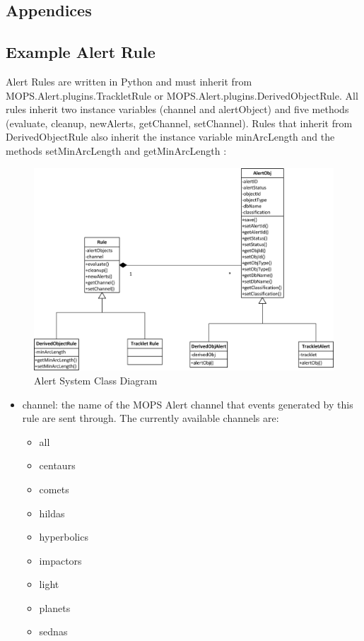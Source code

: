 \documentclass[panstarrs]{panstarrs}
\begin{document}
\begin{appendices}
\section{Appendices}
\subsection{Example Alert Rule}
Alert Rules are written in Python and must inherit from MOPS.Alert.plugins.TrackletRule or MOPS.Alert.plugins.DerivedObjectRule. All rules inherit two instance variables (channel and alertObject) and five methods (evaluate, cleanup, newAlerts, getChannel, setChannel). Rules that inherit from DerivedObjectRule also inherit the instance variable minArcLength and the methods setMinArcLength and getMinArcLength :

\begin{figure}
\begin{center}
\includegraphics[width=7in]{Alerts.jpg}
\caption{ Alert System Class Diagram}
\label{fig:class}
\end{center}
\end{figure}

\begin{itemize}
\item channel: the name of the MOPS Alert channel that events generated by this rule are sent through. The currently available channels are:
\begin{itemize}
\item all
\item centaurs
\item comets
\item hildas
\item hyperbolics
\item impactors
\item light
\item planets
\item sednas 
\end{itemize}


\end{itemize}
\end{appendices}
\end{document}
